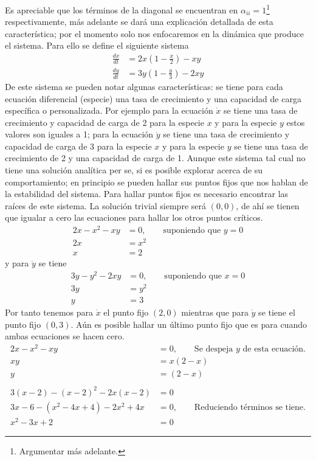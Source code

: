 Es apreciable que los términos de la diagonal se encuentran en $\alpha_{ii} = 1$\footnote{Argumentar más adelante.} respectivamente, más adelante se dará una explicación detallada de esta característica; por el momento solo nos enfocaremos en la dinámica que produce el sistema. Para ello se define el siguiente sistema
\begin{align*}
	\frac{dx}{dt}&=2x\left(1-\frac{x}{2}\right)-xy\\
	\frac{dy}{dt}&=3y\left(1-\frac{y}{3}\right)-2xy
\end{align*}
De este sistema se pueden notar algunas características: se tiene para cada ecuación diferencial (especie) una tasa de crecimiento y una capacidad de carga específica o personalizada. Por ejemplo para la ecuación $\dot{x}$ se tiene una tasa de crecimiento y capacidad de carga de 2 para la especie $x$ y para la especie $y$ estos valores son iguales a 1; para la ecuación $\dot{y}$ se tiene una tasa de crecimiento y capacidad de carga de 3 para la especie $x$ y para la especie $y$ se tiene una tasa de crecimiento de 2 y una capacidad de carga de 1. Aunque este sistema tal cual no tiene una solución analítica per se, si es posible explorar acerca de su comportamiento; en principio se pueden hallar sus puntos fijos que nos hablan de la estabilidad del sistema. Para hallar puntos fijos es necesario encontrar las raíces de este sistema. La solución trivial siempre será $(0,0)$, de ahí se tienen que igualar a cero las ecuaciones para hallar los otros puntos críticos.
\begin{align*}
	2x-x^2-xy &= 0,\qquad\text{suponiendo que $y = 0$}\\
	2x &= x^2\\
	x&=2
\end{align*}
y para $\dot{y}$ se tiene
\begin{align*}
	3y-y^2-2xy&=0,\qquad\text{suponiendo que $x=0$}\\
	3y &= y^2\\
	y &= 3
\end{align*}
Por tanto tenemos para $\dot{x}$ el punto fijo $(2,0)$ mientras que para $\dot{y}$ se tiene el punto fijo $(0,3)$. Aún es posible hallar un último punto fijo que es para cuando ambas ecuaciones se hacen cero.
\begin{align*}
	2x-x^2-xy&=0,\qquad\text{Se despeja $y$ de esta ecuación.}\\
	xy &= x(2-x)\\
	y &= (2-x)\\
	\\
	3(x-2)-(x-2)^2-2x(x-2) &= 0\\
	3x-6-(x^2-4x+4)-2x^2+4x&=0,\qquad\text{Reduciendo términos se tiene.}\\
	x^2-3x+2 &= 0
\end{align*}
